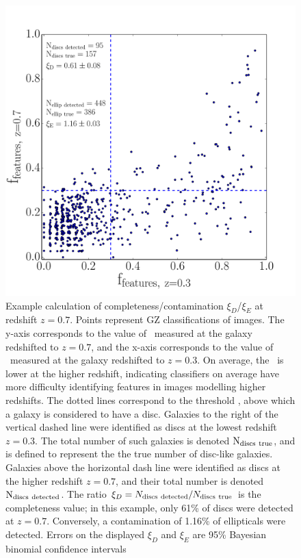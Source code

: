 \documentclass[useAMS,usenatbib]{mn2e}
\begin{document}
\begin{figure}
\centering
\includegraphics[width=.4\textwidth]{figures/incompleteness_z7.pdf}
\caption{Example calculation of completeness/contamination $\xi_D$/$\xi_E$ at redshift $z=0.7$. Points represent GZ classifications of  images. The y-axis corresponds to the value of \ffeatures~measured at the galaxy redshifted to $z=0.7$, and the x-axis corresponds to the value of \ffeatures~measured at the galaxy redshifted to $z=0.3$. On average, the \ffeatures~is lower at the higher redshift, indicating classifiers on average have more difficulty identifying features in images modelling higher redshifts. The dotted lines correspond to the threshold , above which a galaxy is considered to have a disc. Galaxies to the right of the vertical dashed line were identified as discs at the lowest redshift $z=0.3$. The total number of such galaxies is denoted $\rm N_{discs~true}$, and is defined to represent the the true number of disc-like galaxies. Galaxies above the horizontal dash line were identified as discs at the higher redshift $z=0.7$, and their total number is denoted $\rm N_{discs~detected}$. The ratio $\xi_D=N_{\rm discs~detected}/N_{\rm discs~true}$ is the completeness value; in this example, only 61\% of discs were detected at $z=0.7$. Conversely, a contamination of 1.16\% of ellipticals were detected. Errors on the displayed $\xi_D$ and $\xi_E$ are 95\% Bayesian binomial confidence intervals \citep{Cameron2013}}
\label{fig:inc_subplot}
\end{figure}
\end{document}
